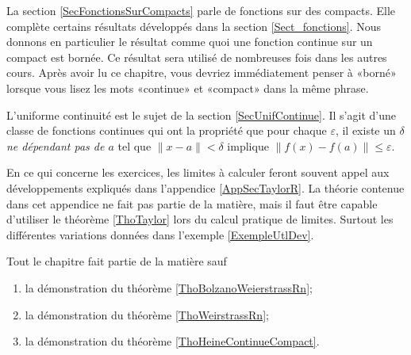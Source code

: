 La section \ref{SecFonctionsSurCompacts} parle de fonctions sur des compacts. Elle complète certains résultats développés dans la section \ref{Sect_fonctions}. Nous donnons en particulier le résultat comme quoi une fonction continue sur un compact est bornée. Ce résultat sera utilisé de nombreuses fois dans les autres cours. Après avoir lu ce chapitre, vous devriez immédiatement penser à «borné» lorsque vous lisez les mots «continue» et «compact» dans la même phrase.

L'uniforme continuité est le sujet de la section \ref{SecUnifContinue}. Il s'agit d'une classe de fonctions continues qui ont la propriété que pour chaque $\varepsilon$, il existe un $\delta$ \emph{ne dépendant pas de $a$} tel que $\| x-a \|<\delta$ implique $\| f(x)-f(a) \|\leq \varepsilon$.

En ce qui concerne les exercices, les limites à calculer feront souvent appel aux développements expliqués dans l'appendice \ref{AppSecTaylorR}. La théorie contenue dans cet appendice ne fait pas partie de la matière, mais il faut être capable d'utiliser le théorème \ref{ThoTaylor} lors du calcul pratique de limites. Surtout les différentes variations données dans l'exemple \ref{ExempleUtlDev}.

Tout le chapitre fait partie de la matière sauf
\begin{enumerate}
	\item
		la démonstration du théorème \ref{ThoBolzanoWeierstrassRn};
	\item
		la démonstration du théorème \ref{ThoWeirstrassRn};
	\item
		la démonstration du théorème \ref{ThoHeineContinueCompact}.
\end{enumerate}
